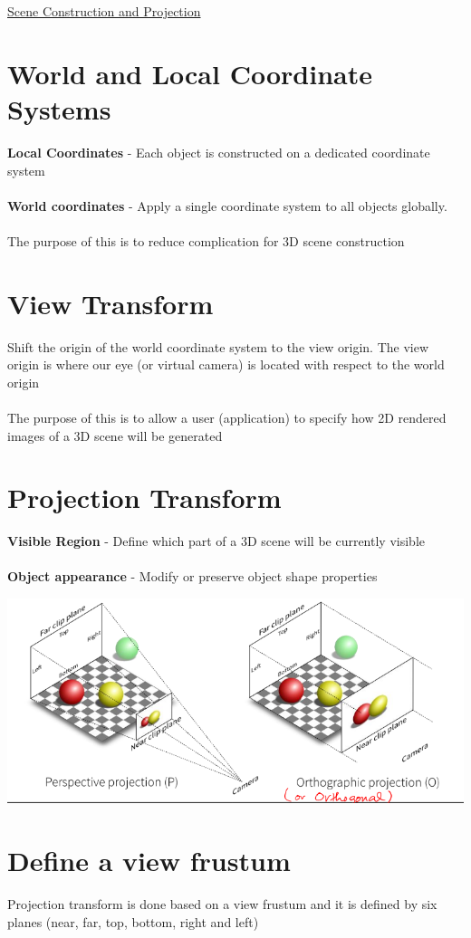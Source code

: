 \documentclass{article}[18pt]
\begin{document}
\begin{center}
\underline{\huge Scene Construction and Projection}
\end{center}
\section{World and Local Coordinate Systems}
\textbf{Local Coordinates} - Each object is constructed on a dedicated coordinate system\\
\\
\textbf{World coordinates} - Apply a single coordinate system to all objects globally.\\
\\
The purpose of this is to reduce complication for 3D scene construction
\section{View Transform}
Shift the origin of the world coordinate system to the view origin. The view origin is where our eye (or virtual camera) is located with respect to the world origin\\
\\
The purpose of this is to allow a user (application) to specify how 2D rendered images of a 3D scene will be generated
\section{Projection Transform}
\textbf{Visible Region} - Define which part of a 3D scene will be currently visible\\
\\
\textbf{Object appearance} - Modify or preserve object shape properties
\begin{center}
	\includegraphics[scale=0.7]{"Projection Transform"}
\end{center}
\section{Define a view frustum}
Projection transform is done based on a view frustum and it is defined by six planes (near, far, top, bottom, right and left)
\end{document}
